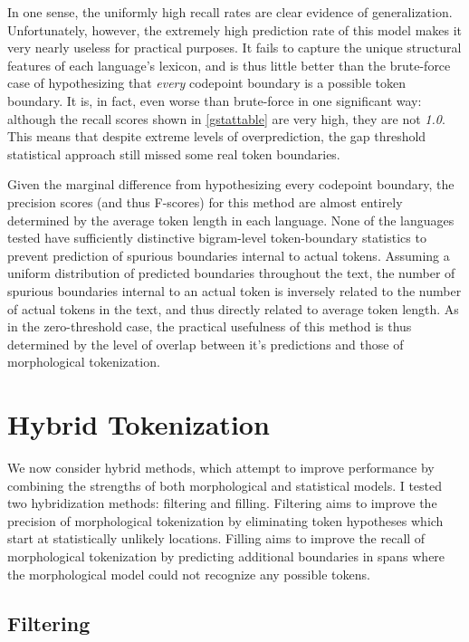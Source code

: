 In one sense, the uniformly high recall rates are clear evidence of generalization. Unfortunately, however, the extremely high prediction rate of this model makes it very nearly useless for practical purposes. It fails to capture the unique structural features of each language's lexicon, and is thus little better than the brute-force case of hypothesizing that \textit{every} codepoint boundary is a possible token boundary. It is, in fact, even worse than brute-force in one significant way: although the recall scores shown in \ref{gstattable} are very high, they are not \textit{1.0}. This means that despite extreme levels of overprediction, the gap threshold statistical approach still missed some real token boundaries.

Given the marginal difference from hypothesizing every codepoint boundary, the precision scores (and thus F-scores) for this method are almost entirely determined by the average token length in each language. None of the languages tested have sufficiently distinctive bigram-level token-boundary statistics to prevent prediction of spurious boundaries internal to actual tokens. Assuming a uniform distribution of predicted boundaries throughout the text, the number of spurious boundaries internal to an actual token is inversely related to the number of actual tokens in the text, and thus directly related to average token length. As in the zero-threshold case, the practical usefulness of this method is thus determined by the level of overlap between it's predictions and those of morphological tokenization.

\FloatBarrier

\section{Hybrid Tokenization}

We now consider hybrid methods, which attempt to improve performance by combining the strengths of both morphological and statistical models. I tested two hybridization methods: filtering and filling. Filtering aims to improve the precision of morphological tokenization by eliminating token hypotheses which start at statistically unlikely locations. Filling aims to improve the recall of morphological tokenization by predicting additional boundaries in spans where the morphological model could not recognize any possible tokens.

\subsection{Filtering}
\FloatBarrier

